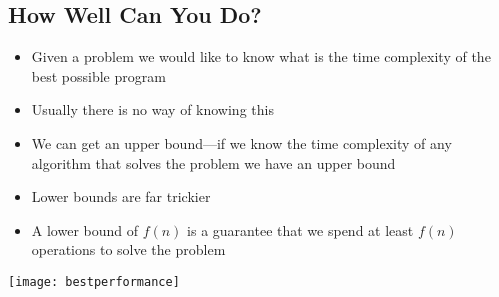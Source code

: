 \begin{slide}
\section[-2]{How Well Can You Do?}

\begin{PauseHighLight}
  \begin{itemize}\squeeze
  \item Given a problem we would like to know what is the time
    complexity of the best possible program\pause
  \item Usually there is no way of knowing this\pause
  \item We can get an upper bound---if we know the time complexity of
    any algorithm that solves the problem we have an upper bound\pause
  \item Lower bounds are far trickier\pause
  \item A lower bound of $f(n)$ is a guarantee that we spend at least
    $f(n)$ operations to solve the problem\pause
  \end{itemize}
  \begin{center}
    \texttt{[image: bestperformance]}\pause
  \end{center}
\end{PauseHighLight}

\end{slide}



